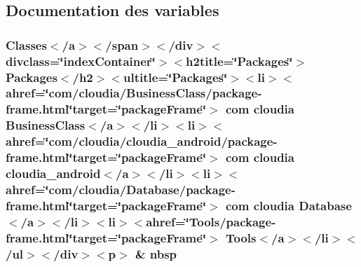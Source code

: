\subsection{Documentation des variables}
\hypertarget{overview-frame_8html_a6840654c8b0ae4623dbedcf1055ea13e}{
\subsubsection[{nbsp}]{\setlength{\rightskip}{0pt plus 5cm}Classes$<$/{\bf a}$>$$<$/{\bf span}$>$$<$/div$>$$<$divclass=\char`\"{}index\-Container\char`\"{}$>$$<$h2title=\char`\"{}Packages\char`\"{}$>$ Packages$<$/h2$>$$<$ultitle=\char`\"{}Packages\char`\"{}$>$$<$li$>$$<$ahref=\char`\"{}com/cloudia/Business\-Class/package-\/frame.\-html\char`\"{}target=\char`\"{}package\-Frame\char`\"{}$>$ com cloudia Business\-Class$<$/{\bf a}$>$$<$/li$>$$<$li$>$$<$ahref=\char`\"{}com/cloudia/cloudia\-\_\-android/package-\/frame.\-html\char`\"{}target=\char`\"{}package\-Frame\char`\"{}$>$ com cloudia cloudia\-\_\-android$<$/{\bf a}$>$$<$/li$>$$<$li$>$$<$ahref=\char`\"{}com/cloudia/Database/package-\/frame.\-html\char`\"{}target=\char`\"{}package\-Frame\char`\"{}$>$ com cloudia Database$<$/{\bf a}$>$$<$/li$>$$<$li$>$$<$ahref=\char`\"{}Tools/package-\/frame.\-html\char`\"{}target=\char`\"{}package\-Frame\char`\"{}$>$ Tools$<$/{\bf a}$>$$<$/li$>$$<$/ul$>$$<$/div$>$$<$p$>$ \& nbsp}}\label{overview-frame_8html_a6840654c8b0ae4623dbedcf1055ea13e}
